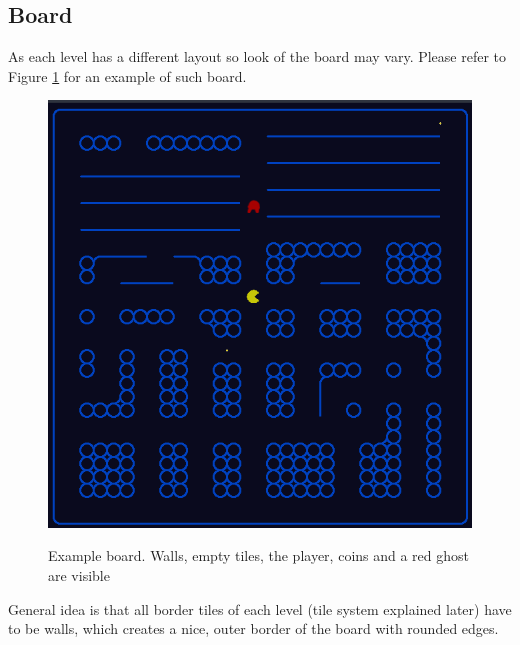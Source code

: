 \documentclass[11pt,a4paper]{report}
\newenvironment{img}{
	\begin{center}
		\begin{figure}
			\begin{center}
			
}{
	\end{center}
		\end{figure}
			\end{center}
}
\begin{document}
			\subsection{Board}
				As each level has a different layout so look of the board may vary. Please refer to Figure \ref{example_board} for an example of such board.
				\begin{img}
					\includegraphics[width=350pt]{images/board_example}\\
					\caption{Example board. Walls, empty tiles, the player, coins and a red ghost are visible}
					\label{example_board}
				\end{img}
				General idea is that all border tiles of each level (tile system explained later) have to be walls, which creates a nice, outer border of the board with rounded edges.
\end{document}
